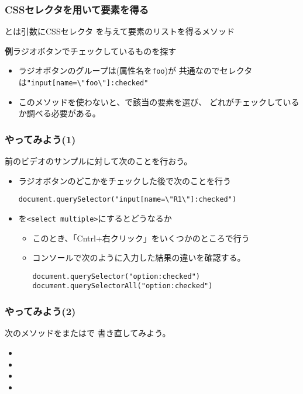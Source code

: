 \iffalse
\begin{frame}[containsverbatim]
 \frametitle{CSSセレクタの注意}
\begin{itemize}
 \item \Verb+E F+ と \Verb+E > F+ の違い
\end{itemize} 
\end{frame}
\fi
\begin{frame}[containsverbatim]
 \frametitle{CSSセレクタを用いて要素を得る}
 とは引数にCSSセレクタ
 を与えて要素のリストを得るメソッド
 
 {\bfseries 例}ラジオボタンでチェックしているものを探す

\begin{itemize}
 \item ラジオボタンのグループは(属性名を\texttt{foo})が
        共通なのでセレクタは\Verb+"input[name=\"foo\"]:checked"+
 \item このメソッドを使わないと、で該当の要素を選び、
       どれがチェックしているか調べる必要がある。
\end{itemize}        


\end{frame}
\begin{frame}[containsverbatim]
 \frametitle{やってみよう(1)}

 前のビデオのサンプルに対して次のことを行おう。
 \begin{itemize}
 \item ラジオボタンのどこかをチェックした後で次のことを行う

        \Verb+document.querySelector("input[name=\"R1\"]:checked")+
  \item {}を\texttt{<select multiple>}にするとどうなるか
        \begin{itemize}
         \item このとき、「Cntrl+右クリック」をいくつかのところで行う
         \item コンソールで次のように入力した結果の違いを確認する。
               
               \texttt{document.querySelector("option:checked")}\\
               \texttt{document.querySelectorAll("option:checked")}
        \end{itemize}
 \end{itemize}
\end{frame}
\begin{frame}[containsverbatim]
 \frametitle{やってみよう(2)}
 次のメソッドをまたはで
 書き直してみよう。
\begin{itemize}
  \item {}
  \item {}
  \item {}
  \item {}
\end{itemize}
\end{frame}
